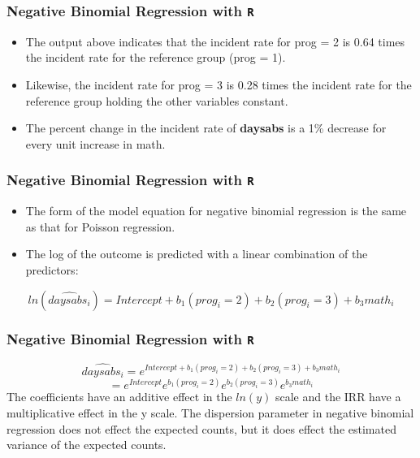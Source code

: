 \documentclass[MASTER.tex]{subfiles}
\begin{document}
\begin{frame}[fragile]
	\frametitle{Negative Binomial Regression with \texttt{R} }
	\Large
	\begin{itemize}
\item 	The output above indicates that the incident rate for prog = 2 is 0.64 times the incident rate for the reference group (prog = 1). 
\item Likewise, the incident rate for prog = 3 is 0.28 times the incident rate for the reference group holding the other variables constant. 
\item The percent change in the incident rate of \textbf{daysabs} is a 1\% decrease for every unit increase in math.
\end{itemize}
\end{frame}
\begin{frame}[fragile]
	\frametitle{Negative Binomial Regression with \texttt{R} }
	\Large
	\begin{itemize}
\item 	The form of the model equation for negative binomial regression is the same as that for Poisson regression. 
\item The log of the outcome is predicted with a linear combination of the predictors:
\end{itemize}
{
	\normalsize
\[ ln(\widehat{daysabs_i}) = Intercept + b_1(prog_i = 2) + b_2(prog_i = 3) + b_3math_i \] 
}
\end{frame}
\begin{frame}[fragile]
	\frametitle{Negative Binomial Regression with \texttt{R} }
	\Large
	
	\[ \widehat{daysabs_i} = e^{Intercept + b_1(prog_i = 2) + b_2(prog_i = 3) + b_3math_i}\]\[ = e^{Intercept}e^{b_1(prog_i = 2)}e^{b_2(prog_i = 3)}e^{b_3math_i} \]
	The coefficients have an additive effect in the \(ln(y)\) scale and the IRR have a multiplicative effect 
	in the y scale. The dispersion parameter in negative binomial regression does not effect the expected counts, 
	but it does effect the estimated variance of the expected counts. 
	\end{frame}
\end{document}
